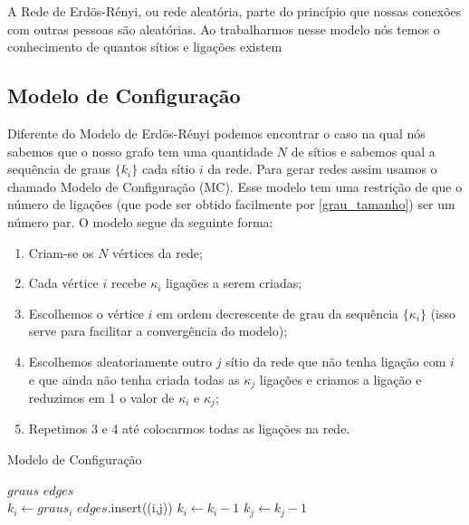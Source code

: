 \documentclass[12pt]{abnt-fisica11}%
\begin{document}
A Rede de Erdös-Rényi, ou rede aleatória, parte do princípio que nossas conexões com outras pessoas são aleatórias. Ao trabalharmos nesse modelo nós temos o conhecimento de quantos sítios e ligações existem

\subsection{Modelo de Configuração}

Diferente do Modelo de Erdös-Rényi podemos encontrar o caso na qual nós sabemos que o nosso grafo tem uma quantidade $N$ de sítios e sabemos qual a sequência de graus $\{k_i\}$ cada sítio $i$ da rede. Para gerar redes assim usamos o chamado Modelo de Configuração (MC). Esse modelo tem uma restrição de que o número de ligações (que pode ser obtido facilmente por \ref{grau_tamanho}) ser um número par. O modelo segue da seguinte forma:

\begin{enumerate}
  \item Criam-se os $N$ vértices da rede;
  \item Cada vértice $i$ recebe $\kappa_i$ ligações a serem criadas;
  \item Escolhemos o vértice $i$ em ordem decrescente de grau da sequência $\{\kappa_i\}$ (isso serve para facilitar a convergência do modelo);
  \item Escolhemos aleatoriamente outro $j$ sítio da rede que não tenha ligação com $i$ e que ainda não tenha criada todas as $\kappa_j$ ligações e criamos a ligação e reduzimos em 1 o valor de $\kappa_i$ e $\kappa_j$;
  \item Repetimos 3 e 4 até colocarmos todas as ligações na rede.
\end{enumerate}

\begin{algorithm}

  \caption{Modelo de Configuração}\label{alg:MC}
  \begin{algorithmic}
  \Require $graus$ 
  \Require $edges$\\

    \State $k_i \gets graus_i$
            \State $edges$.insert((i,j))
            \State $k_i \gets k_i - 1$
            \State $k_j \gets k_j - 1$
          \EndIf
      \EndIf
    \EndWhile
  \EndWhile
  \end{algorithmic}

\end{algorithm}
\end{document}
